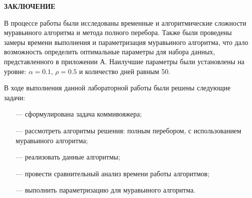 \begin{center}
    \textbf{ЗАКЛЮЧЕНИЕ}
\end{center}

В процессе работы были исследованы временные и алгоритмические сложности муравьиного алгоритма и метода полного перебора. Также были проведены замеры времени выполнения и параметризация муравьиного алгоритма, что дало возможность определить оптимальные параметры для набора данных, представленного в приложении А. Наилучшие параметры были установлены на уровне:  $\alpha = 0.1$, $\rho=0.5$ и количество дней равным 50.


В ходе выполнения данной лабораторной работы были решены следующие задачи:
\begin{itemize} 
    \item[---] сформулирована задача коммивояжера; 
    \item[---] рассмотреть алгоритмы решения: полным перебором, с использованием муравьиного алгоритма; 
    \item[---] реализовать данные алгоритмы; 
    \item[---] провести сравнительный анализ времени работы алгоритмов; 
    \item[---] выполнить параметризацию для муравьиного алгоритма. 
\end{itemize}